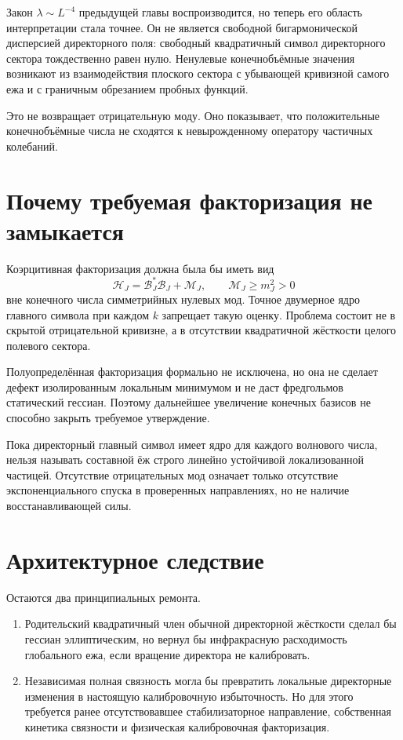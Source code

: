 Закон $\lambda\sim L^{-4}$ предыдущей главы воспроизводится, но теперь его
область интерпретации стала точнее. Он не является свободной
бигармонической дисперсией директорного поля: свободный квадратичный символ
директорного сектора тождественно равен нулю. Ненулевые конечнобъёмные
значения возникают из взаимодействия плоского сектора с убывающей
кривизной самого ежа и с граничным обрезанием пробных функций.

Это не возвращает отрицательную моду. Оно показывает, что положительные
конечнобъёмные числа не сходятся к невырожденному оператору частичных
колебаний.

\section{Почему требуемая факторизация не замыкается}

Коэрцитивная факторизация должна была бы иметь вид
\begin{equation}
 \mathcal H_J=\mathcal B_J^*\mathcal B_J+\mathcal M_J,
 \qquad \mathcal M_J\ge m_J^2>0
\end{equation}
вне конечного числа симметрийных нулевых мод. Точное двумерное ядро
главного символа при каждом $k$ запрещает такую оценку. Проблема состоит не
в скрытой отрицательной кривизне, а в отсутствии квадратичной жёсткости
целого полевого сектора.

Полуопределённая факторизация формально не исключена, но она не сделает
дефект изолированным локальным минимумом и не даст фредгольмов статический
гессиан. Поэтому дальнейшее увеличение конечных базисов не способно
закрыть требуемое утверждение.

\begin{nogocriterion}
Пока директорный главный символ имеет ядро для каждого волнового числа,
нельзя называть составной ёж строго линейно устойчивой локализованной
частицей. Отсутствие отрицательных мод означает только отсутствие
экспоненциального спуска в проверенных направлениях, но не наличие
восстанавливающей силы.
\end{nogocriterion}

\section{Архитектурное следствие}

Остаются два принципиальных ремонта.
\begin{enumerate}
 \item Родительский квадратичный член обычной директорной жёсткости сделал
 бы гессиан эллиптическим, но вернул бы инфракрасную расходимость глобального
 ежа, если вращение директора не калибровать.
 \item Независимая полная связность могла бы превратить локальные
 директорные изменения в настоящую калибровочную избыточность. Но для этого
 требуется ранее отсутствовавшее стабилизаторное направление, собственная
 кинетика связности и физическая калибровочная факторизация.
\end{enumerate}

